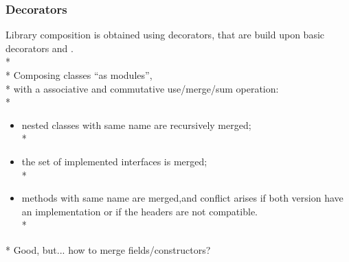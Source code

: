 


\begin{frame}[fragile]
\frametitle{Decorators}

Library composition is obtained using decorators, that are build upon 
basic decorators \Q@Use@ and \Q@Adapt@.\\*
${}_{}$\\*
Composing classes ``as modules'',\\*
\pause with a associative and commutative use/merge/sum
operation:\\*
\begin{itemize}
\pause\item nested classes with same name are recursively merged;\\*
\pause\item the set of implemented interfaces is merged;\\*
\pause\item methods with same name are merged,\pause and conflict arises if both version have an implementation or if the headers are not compatible.\\*
\end{itemize}
${}_{}$\\*
\pause Good, but... how to merge fields/constructors?

\end{frame}


